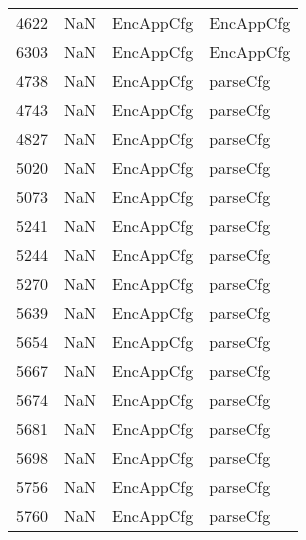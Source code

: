 \begin{tabular}{llll}
4622 &                   NaN &                  EncAppCfg &                                 EncAppCfg \\
6303 &                   NaN &                  EncAppCfg &                                 EncAppCfg \\
4738 &                   NaN &                  EncAppCfg &                                  parseCfg \\
4743 &                   NaN &                  EncAppCfg &                                  parseCfg \\
4827 &                   NaN &                  EncAppCfg &                                  parseCfg \\
5020 &                   NaN &                  EncAppCfg &                                  parseCfg \\
5073 &                   NaN &                  EncAppCfg &                                  parseCfg \\
5241 &                   NaN &                  EncAppCfg &                                  parseCfg \\
5244 &                   NaN &                  EncAppCfg &                                  parseCfg \\
5270 &                   NaN &                  EncAppCfg &                                  parseCfg \\
5639 &                   NaN &                  EncAppCfg &                                  parseCfg \\
5654 &                   NaN &                  EncAppCfg &                                  parseCfg \\
5667 &                   NaN &                  EncAppCfg &                                  parseCfg \\
5674 &                   NaN &                  EncAppCfg &                                  parseCfg \\
5681 &                   NaN &                  EncAppCfg &                                  parseCfg \\
5698 &                   NaN &                  EncAppCfg &                                  parseCfg \\
5756 &                   NaN &                  EncAppCfg &                                  parseCfg \\
5760 &                   NaN &                  EncAppCfg &                                  parseCfg \\

\end{tabular}
